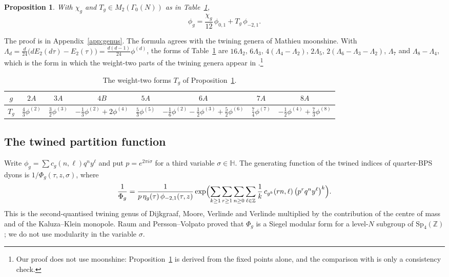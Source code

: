 \documentclass[11pt]{amsart}
\newtheorem{proposition}[theorem]{Proposition}
\theoremstyle{definition}
\newcommand{\ZZ}{\mathbb{Z}}
\newcommand{\HH}{\mathbb{H}}
\begin{document}
\begin{proposition}\label{prop:genus}
With $\chi_g$ and $T_g\in M_2(\Gamma_0(N))$ as in Table~\ref{tab:Tg},
\[
\phi_g=\frac{\chi_g}{12}\,\phi_{0,1}+T_g\,\phi_{-2,1}.
\]
\end{proposition}

The proof is in Appendix~\ref{app:genus}. The formula agrees with the twining genera of Mathieu moonshine. With $\Lambda_d=\frac{d}{24}\bigl(dE_2(d\tau)-E_2(\tau)\bigr)=\frac{d(d-1)}{24}\phi^{(d)}$, the forms of Table~\ref{tab:Tg} are $16\Lambda_2$, $6\Lambda_3$, $4(\Lambda_4-\Lambda_2)$, $2\Lambda_5$, $2(\Lambda_6-\Lambda_3-\Lambda_2)$, $\Lambda_7$ and $\Lambda_8-\Lambda_4$, which is the form in which the weight-two parts of the twining genera appear in \cite{Che10,GHV10}.\footnote{Our proof does not use moonshine: Proposition~\ref{prop:genus} is derived from the fixed points alone, and the comparison with \cite{Che10,GHV10} is only a consistency check.}

\begin{table}[H]
\centering
\caption{The weight-two forms $T_g$ of Proposition~\ref{prop:genus}.}
\label{tab:Tg}
\renewcommand{\arraystretch}{1.2}
\begin{tabular}{cccccccc}
\toprule
$g$ & $2A$ & $3A$ & $4B$ & $5A$ & $6A$ & $7A$ & $8A$\\
\midrule
$T_g$ & $\tfrac43\phi^{(2)}$ & $\tfrac32\phi^{(3)}$ & $-\tfrac13\phi^{(2)}+2\phi^{(4)}$ & $\tfrac53\phi^{(5)}$ & $-\tfrac16\phi^{(2)}-\tfrac12\phi^{(3)}+\tfrac52\phi^{(6)}$ & $\tfrac74\phi^{(7)}$ & $-\tfrac12\phi^{(4)}+\tfrac73\phi^{(8)}$\\
\bottomrule
\end{tabular}
\end{table}

\subsection{The twined partition function}
Write $\phi_g=\sum c_g(n,\ell)q^ny^\ell$ and put $p=e^{2\pi i\sigma}$ for a third variable $\sigma\in\HH$. The generating function of the twined indices of quarter-BPS dyons is $1/\Phi_g(\tau,z,\sigma)$, where \cite{DJS07,Sen10,Che10,PV14}
\begin{equation}\label{eq:Phig}
\frac{1}{\Phi_g}=\frac{1}{p\,\eta_g(\tau)\,\phi_{-2,1}(\tau,z)}\exp\Bigl(\sum_{k\ge1}\sum_{r\ge1}\sum_{n\ge0}\sum_{\ell\in\ZZ}\frac1k\,c_{g^k}(rn,\ell)\,\bigl(p^rq^ny^\ell\bigr)^k\Bigr).
\end{equation}
This is the second-quantised twining genus of Dijkgraaf, Moore, Verlinde and Verlinde \cite{DMVV97} multiplied by the contribution of the centre of mass and of the Kaluza--Klein monopole. Raum and Persson--Volpato proved that $\Phi_g$ is a Siegel modular form for a level-$N$ subgroup of $\mathrm{Sp}_4(\ZZ)$ \cite{Rau13,PV14}; we do not use modularity in the variable $\sigma$.
\end{document}
